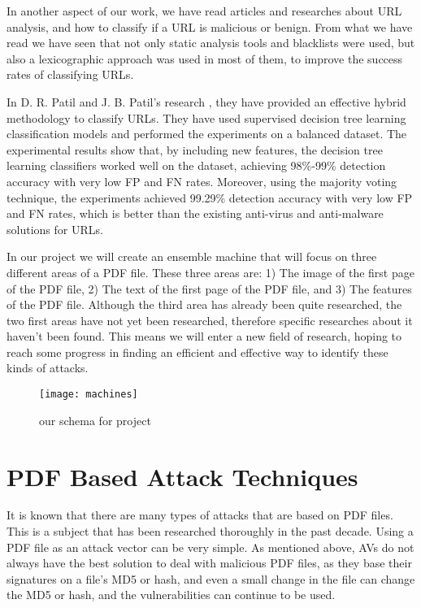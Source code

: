 \documentclass{article}
\begin{document}
\indent In another aspect of our work, we have read articles and researches about URL analysis, and how to classify if a URL is malicious or benign. From what we have read we have seen that not only static analysis tools and blacklists were used, but also a lexicographic approach was used in most of them, to improve the success rates of classifying URLs. 

\clearpage
\newpage

\indent In D. R. Patil and J. B. Patil’s research \cite{patil2018malicious}, they have provided an effective hybrid methodology to classify URLs. They have used supervised decision tree learning classification models and performed the experiments on a balanced dataset. The experimental results show that, by including new features, the decision tree learning classifiers worked well on the dataset, achieving 98\%-99\% detection accuracy with very low FP and FN rates. Moreover, using the majority voting technique, the experiments achieved 99.29\% detection accuracy with very low FP and FN rates, which is better than the existing anti-virus and anti-malware solutions for URLs.

\indent In our project we will create an ensemble machine that will focus on three different areas of a PDF file. These three areas are: 1) The image of the first page of the PDF file, 2) The text of the first page of the PDF file, and 3) The features of the PDF file. Although the third area has already been quite researched, the two first areas have not yet been researched, therefore specific researches about it haven't been found. This means we will enter a new field of research, hoping to reach some progress in finding an efficient and effective way to identify these kinds of attacks. 

\begin{figure}[h]
    \centering
    \texttt{[image: machines]}
    \\
    \caption{our schema for project}
    \label{fig:blur}
\end{figure}
\section[PDF Based Attack Techniques]{PDF Based Attack Techniques \cite{BGU2014malicious}}
\indent	It is known that there are many types of attacks that are based on PDF files. This is a subject that has been researched thoroughly in the past decade. Using a PDF file as an attack vector can be very simple. As mentioned above, AVs do not always have the best solution to deal with malicious PDF files, as they base their signatures on a file’s MD5 or hash, and even a small change in the file can change the MD5 or hash, and the vulnerabilities can continue to be used.
\end{document}
